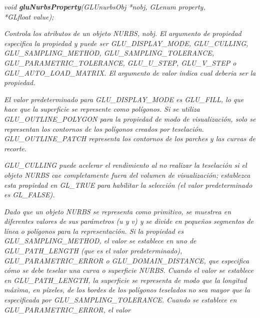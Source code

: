 \documentclass[]{article}
\begin{document}
\begin{description}
    \item \emph{void \textbf{gluNurbsProperty}(GLUnurbsObj *nobj, GLenum property,\\*GLfloat value);}
    \begin{description}
        \item \textit{
            Controla los atributos de un objeto NURBS,
            nobj. El argumento de propiedad especifica la propiedad
            y puede ser GLU\_DISPLAY\_MODE, GLU\_CULLING, GLU\_SAMPLING\_METHOD,
            GLU\_SAMPLING\_TOLERANCE, GLU\_PARAMETRIC\_TOLERANCE, GLU\_U\_STEP,
            GLU\_V\_STEP o GLU\_AUTO\_LOAD\_MATRIX. El argumento de valor indica
            cual deberia ser la propiedad.
        }
        \item \textit{
            El valor predeterminado para GLU\_DISPLAY\_MODE
            es GLU\_FILL, lo que hace que la superficie se represente
            como polígonos. Si se utiliza GLU\_OUTLINE\_POLYGON para la
            propiedad de modo de visualización, solo se representan los
            contornos de los polígonos creados por teselación.
            GLU\_OUTLINE\_PATCH representa los contornos de los parches
            y las curvas de recorte.
        }
        \item \textit{
            GLU\_CULLING puede acelerar el rendimiento al
            no realizar la teselación si el objeto NURBS cae completamente
            fuera del volumen de visualización; establezca esta propiedad
            en GL\_TRUE para habilitar la selección (el valor
            predeterminado es GL\_FALSE).
        }
        \item \textit{Dado que un objeto NURBS se representa como
            primitivo, se muestrea en diferentes valores de sus
            parámetros (u y v) y se divide en pequeños segmentos de
            línea o polígonos para la representación. Si la propiedad
            es GLU\_SAMPLING\_METHOD, el valor se establece en uno
            de GLU\_PATH\_LENGTH (que es el valor
            predeterminado), GLU\_PARAMETRIC\_ERROR o
            GLU\_DOMAIN\_DISTANCE, que
            especifica cómo se debe teselar una curva o superficie
            NURBS. Cuando el valor se establece en GLU\_PATH\_LENGTH,
            la superficie se representa de modo que la longitud máxima,
            en píxeles, de los bordes de los polígonos teselados no
            sea mayor que la especificada por GLU\_SAMPLING\_TOLERANCE.
            Cuando se establece en GLU\_PARAMETRIC\_ERROR, el valor
}
\end{description}
\end{description}
\end{document}
